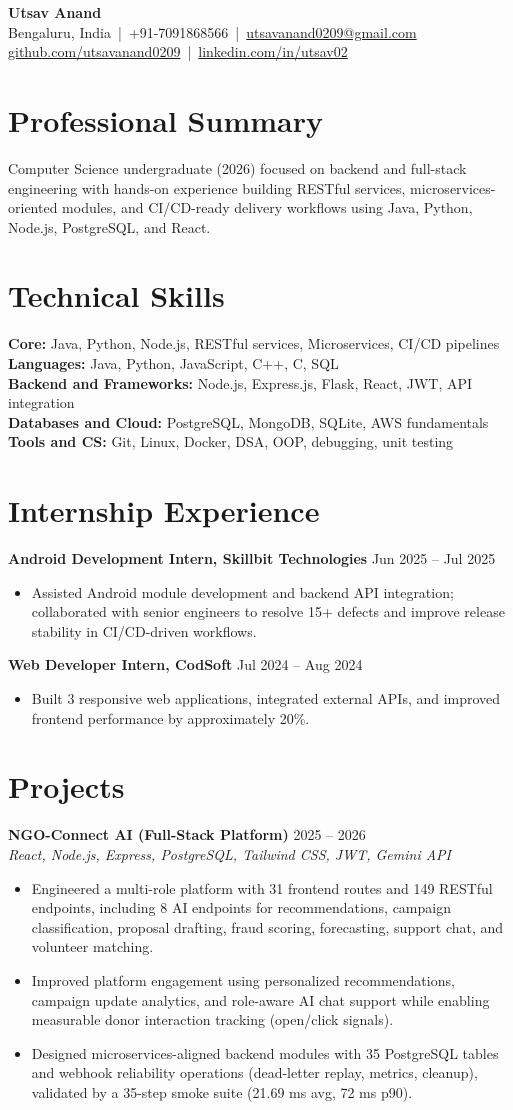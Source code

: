 \documentclass[10pt]{article}
\newcommand{\resheading}[1]{\section*{#1}}
\newcommand{\resitem}[1]{\item #1}
\newcommand{\resproject}[3]{\textbf{#1} \hfill #2\\\textit{#3}}
\begin{document}
\begin{center}
    {\LARGE \textbf{Utsav Anand}}\\[3pt]
    Bengaluru, India \,|\, +91-7091868566 \,|\, \href{mailto:utsavanand0209@gmail.com}{utsavanand0209@gmail.com}\\[1pt]
    \href{https://github.com/utsavanand0209}{github.com/utsavanand0209} \,|\, \href{https://www.linkedin.com/in/utsav02/}{linkedin.com/in/utsav02}
\end{center}

\resheading{Professional Summary}
Computer Science undergraduate (2026) focused on backend and full-stack engineering with hands-on experience building RESTful services, microservices-oriented modules, and CI/CD-ready delivery workflows using Java, Python, Node.js, PostgreSQL, and React.

\resheading{Technical Skills}
\textbf{Core:} Java, Python, Node.js, RESTful services, Microservices, CI/CD pipelines\\
\textbf{Languages:} Java, Python, JavaScript, C++, C, SQL\\
\textbf{Backend and Frameworks:} Node.js, Express.js, Flask, React, JWT, API integration\\
\textbf{Databases and Cloud:} PostgreSQL, MongoDB, SQLite, AWS fundamentals\\
\textbf{Tools and CS:} Git, Linux, Docker, DSA, OOP, debugging, unit testing

\resheading{Internship Experience}
\textbf{Android Development Intern, Skillbit Technologies} \hfill Jun 2025 -- Jul 2025
\begin{itemize}
    \resitem{Assisted Android module development and backend API integration; collaborated with senior engineers to resolve 15+ defects and improve release stability in CI/CD-driven workflows.}
\end{itemize}

\textbf{Web Developer Intern, CodSoft} \hfill Jul 2024 -- Aug 2024
\begin{itemize}
    \resitem{Built 3 responsive web applications, integrated external APIs, and improved frontend performance by approximately 20\%.}
\end{itemize}

\resheading{Projects}
\resproject{NGO-Connect AI (Full-Stack Platform)}{2025 -- 2026}{React, Node.js, Express, PostgreSQL, Tailwind CSS, JWT, Gemini API}
\begin{itemize}
    \resitem{Engineered a multi-role platform with 31 frontend routes and 149 RESTful endpoints, including 8 AI endpoints for recommendations, campaign classification, proposal drafting, fraud scoring, forecasting, support chat, and volunteer matching.}
    \resitem{Improved platform engagement using personalized recommendations, campaign update analytics, and role-aware AI chat support while enabling measurable donor interaction tracking (open/click signals).}
    \resitem{Designed microservices-aligned backend modules with 35 PostgreSQL tables and webhook reliability operations (dead-letter replay, metrics, cleanup), validated by a 35-step smoke suite (21.69 ms avg, 72 ms p90).}
\end{itemize}
\end{document}
